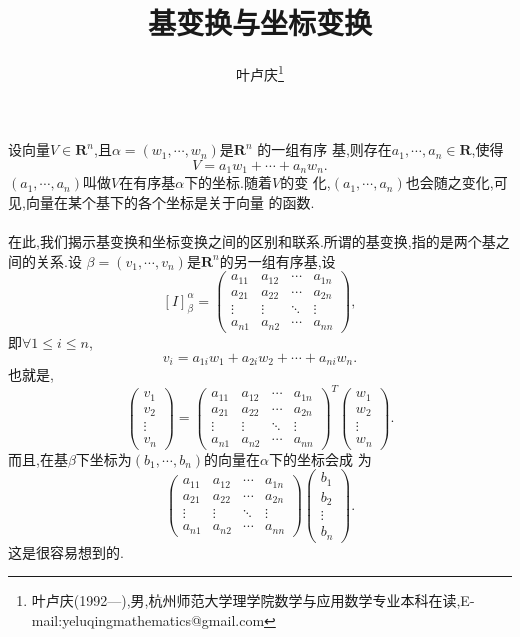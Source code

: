 \documentclass[a4paper]{article}
\begin{document}
\title{\huge{\bf{基变换与坐标变换}}} \author{\small{叶卢庆\footnote{叶卢庆(1992---),男,杭州师范大学理学院数学与应用数学专业本科在读,E-mail:yeluqingmathematics@gmail.com}}}
\maketitle
设向量$V\in \mathbf{R}^n$,且$\alpha=(w_1,\cdots,w_n)$是$\mathbf{R}^n$
的一组有序
基,则存在$a_1,\cdots,a_n\in \mathbf{R}$,使得
$$
V=a_1w_1+\cdots+a_nw_n.
$$
$(a_1,\cdots,a_n)$叫做$V$在有序基$\alpha$下的坐标.随着$V$的变
化,$(a_1,\cdots,a_n)$也会随之变化,可见,向量在某个基下的各个坐标是关于向量
的函数.\\\\

在此,我们揭示基变换和坐标变换之间的区别和联系.所谓的基变换,指的是两个基之间的关系.设
$\beta=(v_1,\cdots,v_n)$是$\mathbf{R}^n$的另一组有序基,设
$$
[I]_{\beta}^{\alpha}=
\begin{pmatrix}
  a_{11}&a_{12}&\cdots&a_{1n}\\
  a_{21}&a_{22}&\cdots&a_{2n}\\
  \vdots&\vdots&\ddots&\vdots\\
a_{n1}&a_{n2}&\cdots&a_{nn}
\end{pmatrix},
$$
即$\forall 1\leq i\leq n$,
$$
v_i=a_{1i}w_1+a_{2i}w_2+\cdots+a_{ni}w_n.
$$
也就是,
$$
\begin{pmatrix}
v_1\\
v_2\\
\vdots\\
v_n
\end{pmatrix}=\begin{pmatrix}
  a_{11}&a_{12}&\cdots&a_{1n}\\
  a_{21}&a_{22}&\cdots&a_{2n}\\
  \vdots&\vdots&\ddots&\vdots\\
a_{n1}&a_{n2}&\cdots&a_{nn}
\end{pmatrix}^T
\begin{pmatrix}
  w_1\\
w_2\\
\vdots\\
w_n
\end{pmatrix}.
$$
而且,在基$\beta$下坐标为$(b_1,\cdots,b_n)$的向量在$\alpha$下的坐标会成
为
$$
\begin{pmatrix}
  a_{11}&a_{12}&\cdots&a_{1n}\\
  a_{21}&a_{22}&\cdots&a_{2n}\\
  \vdots&\vdots&\ddots&\vdots\\
a_{n1}&a_{n2}&\cdots&a_{nn}
\end{pmatrix}
\begin{pmatrix}
  b_1\\
b_2\\
\vdots\\
b_n
\end{pmatrix}.
$$
这是很容易想到的.
\end{document}
